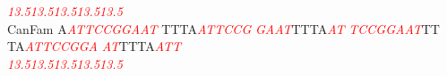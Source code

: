 \documentclass[11pt,twoside,reqno,a4paper]{article}
\begin{document}
{\hspace*{7\charwidth}\hspace*{1\charwidth}\textit{\textcolor{red}{13.5}}\hspace*{1\charwidth}\hspace*{10\charwidth}\textit{\textcolor{red}{13.5}}\hspace*{1\charwidth}\hspace*{10\charwidth}\textit{\textcolor{red}{13.5}}\hspace*{1\charwidth}\hspace*{1\charwidth}\hspace*{10\charwidth}\textit{\textcolor{red}{13.5}}\hspace*{1\charwidth}\hspace*{10\charwidth}\textit{\textcolor{red}{13.5}}\hspace*{1\charwidth}\\
CanFam	A\textit{\textcolor{red}{A}}\textit{\textcolor{red}{T}}\textit{\textcolor{red}{T}}\textit{\textcolor{red}{C}}\textit{\textcolor{red}{C}}\textit{\textcolor{red}{G}}\textit{\textcolor{red}{G}}\textit{\textcolor{red}{A}}\textit{\textcolor{red}{A}}\textit{\textcolor{red}{T}}	TTTA\textit{\textcolor{red}{A}}\textit{\textcolor{red}{T}}\textit{\textcolor{red}{T}}\textit{\textcolor{red}{C}}\textit{\textcolor{red}{C}}\textit{\textcolor{red}{G}}	\textit{\textcolor{red}{G}}\textit{\textcolor{red}{A}}\textit{\textcolor{red}{A}}\textit{\textcolor{red}{T}}TTTA\textit{\textcolor{red}{A}}\textit{\textcolor{red}{T}}	\textit{\textcolor{red}{T}}\textit{\textcolor{red}{C}}\textit{\textcolor{red}{C}}\textit{\textcolor{red}{G}}\textit{\textcolor{red}{G}}\textit{\textcolor{red}{A}}\textit{\textcolor{red}{A}}\textit{\textcolor{red}{T}}TT	TA\textit{\textcolor{red}{A}}\textit{\textcolor{red}{T}}\textit{\textcolor{red}{T}}\textit{\textcolor{red}{C}}\textit{\textcolor{red}{C}}\textit{\textcolor{red}{G}}\textit{\textcolor{red}{G}}\textit{\textcolor{red}{A}}	\textit{\textcolor{red}{A}}\textit{\textcolor{red}{T}}TTTA\textit{\textcolor{red}{A}}\textit{\textcolor{red}{T}}\textit{\textcolor{red}{T}}\\
\hspace*{7\charwidth}\hspace*{1\charwidth}\textit{\textcolor{red}{13.5}}\hspace*{1\charwidth}\hspace*{10\charwidth}\textit{\textcolor{red}{13.5}}\hspace*{1\charwidth}\hspace*{10\charwidth}\textit{\textcolor{red}{13.5}}\hspace*{1\charwidth}\hspace*{1\charwidth}\hspace*{10\charwidth}\textit{\textcolor{red}{13.5}}\hspace*{1\charwidth}\hspace*{10\charwidth}\textit{\textcolor{red}{13.5}}\hspace*{1\charwidth}\\
}
\end{document}
